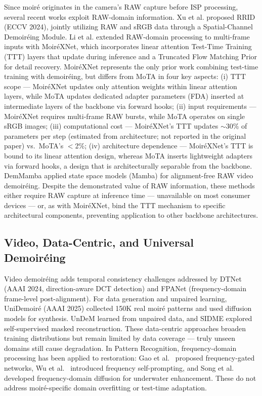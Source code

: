 \documentclass[review,10pt]{elsarticle}
\begin{document}
Since moir\'{e} originates in the camera's RAW capture before ISP processing, several recent works exploit RAW-domain information. Xu et al. \cite{xu2024image} proposed RRID (ECCV 2024), jointly utilizing RAW and sRGB data through a Spatial-Channel Demoir\'{e}ing Module. Li et al. \cite{li2025moirexnet} extended RAW-domain processing to multi-frame inputs with Moir\'{e}XNet, which incorporates linear attention Test-Time Training (TTT) layers that update during inference and a Truncated Flow Matching Prior for detail recovery. Moir\'{e}XNet represents the only prior work combining test-time training with demoir\'{e}ing, but differs from MoTA in four key aspects: (i) TTT scope --- Moir\'{e}XNet updates only attention weights within linear attention layers, while MoTA updates dedicated adapter parameters (FDA) inserted at intermediate layers of the backbone via forward hooks; (ii) input requirements --- Moir\'{e}XNet requires multi-frame RAW bursts, while MoTA operates on single sRGB images; (iii) computational cost --- Moir\'{e}XNet's TTT updates $\sim$30\% of parameters per step (estimated from architecture; not reported in the original paper) vs.\ MoTA's $<$2\%; (iv) architecture dependence --- Moir\'{e}XNet's TTT is bound to its linear attention design, whereas MoTA inserts lightweight adapters via forward hooks, a design that is architecturally separable from the backbone. DemMamba \cite{xu2024demmamba} applied state space models (Mamba) for alignment-free RAW video demoir\'{e}ing. Despite the demonstrated value of RAW information, these methods either require RAW capture at inference time --- unavailable on most consumer devices --- or, as with Moir\'{e}XNet, bind the TTT mechanism to specific architectural components, preventing application to other backbone architectures.

\subsection{Video, Data-Centric, and Universal Demoir\'{e}ing}

Video demoir\'{e}ing adds temporal consistency challenges addressed by DTNet \cite{xu2024direction} (AAAI 2024, direction-aware DCT detection) and FPANet \cite{oh2025fpanet} (frequency-domain frame-level post-alignment). For data generation and unpaired learning, UniDemoir\'{e} \cite{yang2025unidemoire} (AAAI 2025) collected 150K real moir\'{e} patterns and used diffusion models for synthesis. UnDeM \cite{zhong2024undem} learned from unpaired data, and SIDME \cite{wang2025sidme} explored self-supervised masked reconstruction. These data-centric approaches broaden training distributions but remain limited by data coverage --- truly unseen domains still cause degradation. In Pattern Recognition, frequency-domain processing has been applied to restoration: Gao et al.~\cite{gao2025fdt} proposed frequency-gated networks, Wu et al.~\cite{wu2025freprompter} introduced frequency self-prompting, and Song et al.~\cite{song2025fddm} developed frequency-domain diffusion for underwater enhancement. These do not address moir\'{e}-specific domain overfitting or test-time adaptation.
\end{document}
